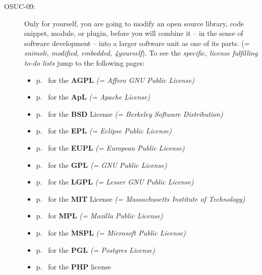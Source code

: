 \begin{description}
\item[OSUC-09:]\label{OSUC-09-DEF} Only for yourself, you are going to modify an
open source library, code snippet, module, or plugin, before you will combine it
-- in the sense of software development -- into a larger software unit as one of
its parts. (= \textit{snimoli, modified, embedded, 4yourself}). 
To see the \textit{specific, license fulfilling to-do lists} jump to the
following pages:
  \begin{itemize}
    \item p.\ \pageref{OSUC-09-AGPL} for the \textbf{AGPL}
      \textit{(= Affero GNU Public License)} 
    \item p.\ \pageref{OSUC-09-Apache20} for the \textbf{ApL}
      \textit{(= Apache License)}
    \item p.\ \pageref{OSUC-09-BSD} for the \textbf{BSD} License
      \textit{(= Berkeley Software Distribution)}
    \item p.\ \pageref{OSUC-09-EPL} for the \textbf{EPL}
      \textit{(= Eclipse Public License)}     
    \item p.\ \pageref{OSUC-09-EUPL} for the \textbf{EUPL}
      \textit{(= European Public License)} 
    \item p.\ \pageref{OSUC-09-GPL} for the \textbf{GPL}
       \textit{(= GNU Public License)} 
    \item p.\ \pageref{OSUC-09-LGPL} for the \textbf{LGPL}
      \textit{(= Lesser GNU Public License)}           
    \item p.\ \pageref{OSUC-09-MIT} for the \textbf{MIT} License
       \textit{(= Massachusetts Institute of Technology)} 
    \item p.\ \pageref{OSUC-09-MPL} for \textbf{MPL}
      \textit{(= Mozilla Public License)}     
    \item p.\ \pageref{OSUC-09-MsPL} for the \textbf{MSPL}
      \textit{(= Microsoft Public License)} 
    \item p.\ \pageref{OSUC-09-PGL} for the \textbf{PGL}
      \textit{(= Postgres License)} 
    \item p.\ \pageref{OSUC-09-PHP} for the \textbf{PHP} license 
  \end{itemize}



\end{description}

